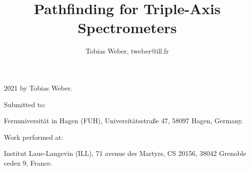 \documentclass[english, 11pt, a4paper]{book}
\newcommand{\ill}{\par{Institut Laue-Langevin (ILL), 71 avenue des Martyrs, CS 20156, 38042 Grenoble cedex 9, France.\par}}
\newcommand{\fuh}{\par{Fernuniversit\"at in Hagen (FUH), Universit\"atsstraße 47, 58097 Hagen, Germany.\par}}
\begin{document}
%

\title{Pathfinding for Triple-Axis Spectrometers}
\author{Tobias Weber, tweber@ill.fr}
\maketitle

\vspace*{\fill}
\textcopyright{} 2021 by Tobias Weber.

Submitted to: \fuh{}

Work performed at: \ill{}

\tableofcontents




















\appendix




%



\listoffigures{}
\listoftables{}
\cleardoublepage
{}

\end{document}
